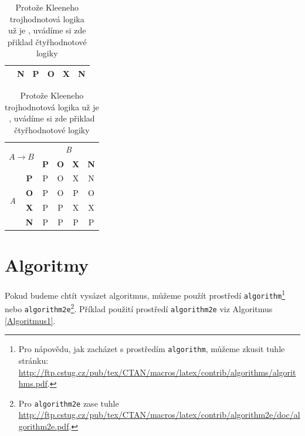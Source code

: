 \documentclass[a4paper, 11pt]{article}
\begin{document}
\begin{table}[ht]
\begin{center}
\begin{tabular}{|c|c|c|c|c|c|}
                                      & \textbf{N}        & P          & O          & X          & N          \\ \hline
        \end{tabular}
        \begin{tabular}{|c|c|c|c|c|c|}
            \hline
            \multicolumn{2}{|c|}{\multirow{2}{*}{$A \rightarrow B$}} & \multicolumn{4}{c|}{\emph{B}}          \\ \cline{3-6}
            \multicolumn{2}{|c|}{}                        & \textbf{P} & \textbf{O} & \textbf{X} & \textbf{N} \\ \hline
            \multirow{4}{*}{\emph{A}} & \textbf{P}        & P          & O          & X          & N          \\ \cline{2-6}
                                      & \textbf{O}        & P          & O          & P          & O          \\ \cline{2-6}
                                      & \textbf{X}        & P          & P          & X          & X          \\ \cline{2-6}
                                      & \textbf{N}        & P          & P          & P          & P          \\ \hline
        \end{tabular}
        \label{TabulkaLogiky}
        \caption{Protože Kleeneho trojhodnotová logika už je , uvádíme si zde přiklad čtyřhodnotové logiky}\label{tab2}
    \end{center}
\end{table}
\shorthandon{-}

\section{Algoritmy}\label{sekce3}

Pokud budeme chtít vysázet algoritmus, můžeme použít prostředí \texttt{algorithm}\footnote{Pro nápovědu, jak zacházet s prostředím \texttt{algorithm}, můžeme zkusit tuhle stránku:\\
\href{http://ftp.cstug.cz/pub/tex/CTAN/macros/latex/contrib/algorithms/algorithms.pdf}
{http://ftp.cstug.cz/pub/tex/CTAN/macros/latex/contrib/algorithms/algorithms.pdf}.} nebo \texttt{algorithm2e}\footnote{Pro \texttt{algorithm2e} zase tuhle \href{http://ftp.cstug.cz/pub/tex/CTAN/macros/latex/contrib/algorithm2e/doc/algorithm2e.pdf}{http://ftp.cstug.cz/pub/tex/CTAN/macros/latex/contrib/algorithm2e/doc/algorithm2e.pdf}.}. Příklad použití prostředí \texttt{algorithm2e} viz Algoritmus \ref{Algoritmus1}.
\end{document}
